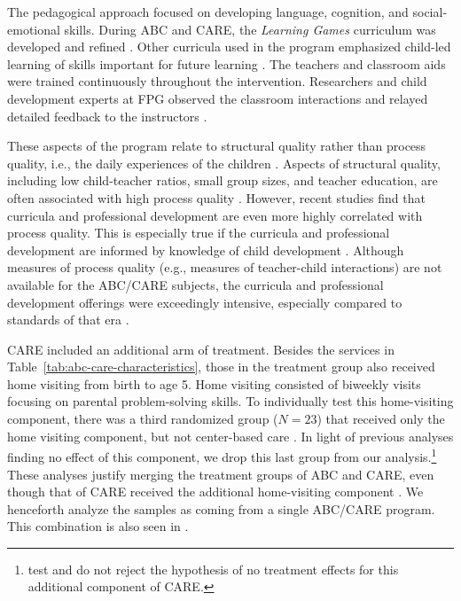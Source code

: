 The pedagogical approach focused on developing language, cognition, and social-emotional skills. During ABC and CARE, the \textit{Learning Games} curriculum was developed and refined \citep{Sparling_Lewis_1979_BOOKLearninggamesFirstThree}. Other curricula used in the program emphasized child-led learning of skills important for future learning \citep{Conti_etal_2016_LongTermHealth}. The teachers and classroom aids were trained continuously throughout the intervention. Researchers and child development experts at FPG observed the classroom interactions and relayed detailed feedback to the instructors \citep{Ramey-etal_2012-ABC}. 

These aspects of the program relate to structural quality rather than process quality, i.e., the daily experiences of the children \citep{Thomason_LaParo_2009_EED}. Aspects of structural quality, including low child-teacher ratios, small group sizes, and teacher education, are often associated with high process quality \citep{Phillipsen_etal_1997_ECRQ}. However, recent studies find that curricula and professional development are even more highly correlated with process quality. This is especially true if the curricula and professional development are informed by knowledge of child development \citep{Slot_etal_2015_Dutch_ECRQ}. Although measures of process quality (e.g., measures of teacher-child interactions) are not available for the ABC/CARE subjects, the curricula and professional development offerings were exceedingly intensive, especially compared to standards of that era \citep{Ramey-etal_2012-ABC}. 

CARE included an additional arm of treatment. Besides the services in Table~\ref{tab:abc-care-characteristics}, those in the treatment group also received home visiting from birth to age 5. Home visiting consisted of biweekly visits focusing on parental problem-solving skills. To individually test this home-visiting component, there was a third randomized group ($N=23$) that received only the home visiting component, but not center-based care \citep{Wasik_Ramey_etal_1990_CD}. In light of previous analyses finding no effect of this component, we drop this last group from our analysis.\footnote{\citet{Campbell_Conti_etal_2014_EarlyChildhoodInvestments} test and do not reject the hypothesis of no treatment effects for this additional component of CARE.} These analyses justify merging the treatment groups of ABC and CARE, even though that of CARE received the additional home-visiting component \citep{ABCCARE_Dataset}. We henceforth analyze the samples as coming from a single ABC/CARE program. This combination is also seen in \citet{Burchinal_etal_2006_MSRCD_IV-Growth-Curve}.

